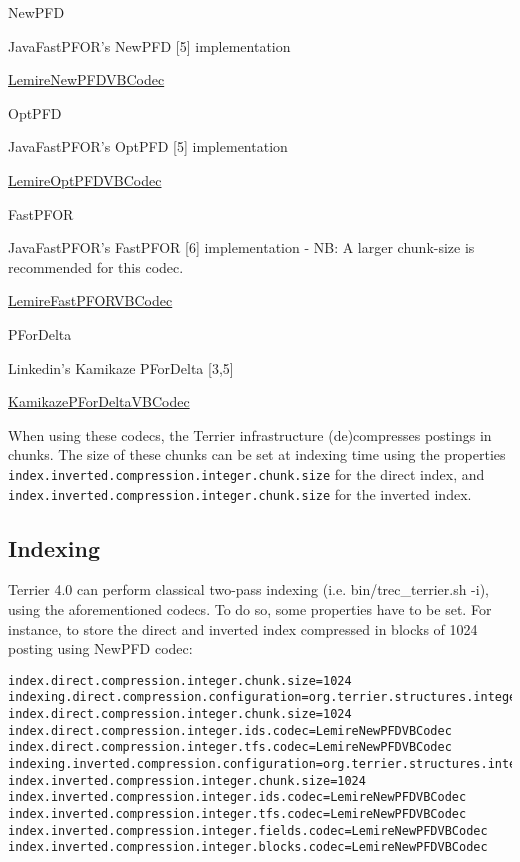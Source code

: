 NewPFD

JavaFastPFOR's NewPFD {[}5{]} implementation

\href{javadoc/org/terrier/compression/integer/codec/LemireNewPFDVBCodec.html}{LemireNewPFDVBCodec}

OptPFD

JavaFastPFOR's OptPFD {[}5{]} implementation

\href{javadoc/org/terrier/compression/integer/codec/LemireOptPFDVBCodec.html}{LemireOptPFDVBCodec}

FastPFOR

JavaFastPFOR's FastPFOR {[}6{]} implementation - NB: A larger chunk-size
is recommended for this codec.

\href{javadoc/org/terrier/compression/integer/codec/LemireFastPFORVBCodec.html}{LemireFastPFORVBCodec}

PForDelta

Linkedin's Kamikaze PForDelta {[}3,5{]}

\href{javadoc/org/terrier/compression/integer/codec/KamikazePForDeltaVBCodec.html}{KamikazePForDeltaVBCodec}

When using these codecs, the Terrier infrastructure (de)compresses
postings in chunks. The size of these chunks can be set at indexing time
using the properties
\texttt{index.inverted.compression.integer.chunk.size} for the direct
index, and \texttt{index.inverted.compression.integer.chunk.size} for
the inverted index.

\subsection{Indexing}\label{indexing}

Terrier 4.0 can perform classical two-pass indexing (i.e.
bin/trec\_terrier.sh -i), using the aforementioned codecs. To do so,
some properties have to be set. For instance, to store the direct and
inverted index compressed in blocks of 1024 posting using NewPFD codec:

\begin{verbatim}
index.direct.compression.integer.chunk.size=1024
indexing.direct.compression.configuration=org.terrier.structures.integer.IntegerCodecCompressionConfiguration
index.direct.compression.integer.chunk.size=1024
index.direct.compression.integer.ids.codec=LemireNewPFDVBCodec
index.direct.compression.integer.tfs.codec=LemireNewPFDVBCodec
indexing.inverted.compression.configuration=org.terrier.structures.integer.IntegerCodecCompressionConfiguration
index.inverted.compression.integer.chunk.size=1024
index.inverted.compression.integer.ids.codec=LemireNewPFDVBCodec
index.inverted.compression.integer.tfs.codec=LemireNewPFDVBCodec
index.inverted.compression.integer.fields.codec=LemireNewPFDVBCodec
index.inverted.compression.integer.blocks.codec=LemireNewPFDVBCodec
\end{verbatim}

